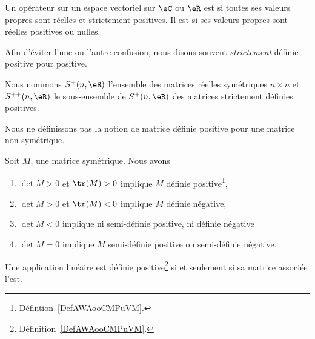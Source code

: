 \begin{definition}    \label{DefAWAooCMPuVM}
    Un opérateur sur un espace vectoriel sur \( \eC\) ou \( \eR\) est  si toutes ses valeurs propres sont réelles et strictement positives.  Il est  si ses valeurs propres sont réelles positives ou nulles.
\end{definition}
Afin d'éviter l'une ou l'autre confusion, nous disons souvent \emph{strictement} définie positive pour positive.

\begin{normaltext}      \label{NORMooAJLHooQhwpvr}
    Nous nommons \( S^+(n,\eR)\) l'ensemble des matrices réelles symétriques \( n\times n\) et \( S^{++}(n,\eR)\) le sous-ensemble de \( S^+(n,\eR)\) des matrices strictement définies positives.
\end{normaltext}

\begin{remark}
    Nous ne définissons pas la notion de matrice définie positive pour une matrice non symétrique.
\end{remark}

\begin{proposition}     \label{PropcnJyXZ}
    Soit $M$, une matrice symétrique. Nous avons
    \begin{enumerate}
        \item       \label{ITEMooTJVQooYmRkas}
            $\det M>0$ et $\tr(M)>0$ implique $M$ définie positive\footnote{Défintion~\ref{DefAWAooCMPuVM}.},
        \item
        $\det M>0$ et $\tr(M)<0$ implique $M$ définie négative,
    \item   \label{ItemluuFPN}
        $\det M<0$ implique ni semi-définie positive, ni définie négative
        \item
        $\det M=0$ implique $M$ semi-définie positive ou semi-définie négative.
    \end{enumerate}
\end{proposition}

\begin{proposition}     \label{PROPooUAAFooEGVDRC}
    Une application linéaire est définie positive\footnote{Définition~\ref{DefAWAooCMPuVM}.} si et seulement si sa matrice associée l'est.
\end{proposition}

